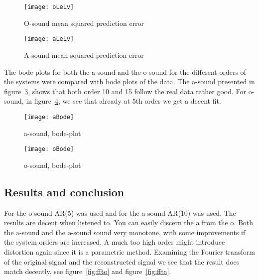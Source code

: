 \documentclass[10pt]{article}
\begin{document}
\begin{figure}[!hp]

    \begin{center}
      \texttt{[image: oLeLv]}
    \caption{O-sound mean squared prediction error \label{fig:oLeLv}}
    \end{center}

\end{figure}

\begin{figure}[!hp]

    \begin{center}
      \texttt{[image: aLeLv]}
    \caption{A-sound mean squared prediction error \label{fig:aLeLv}}
    \end{center}

\end{figure}

The bode plots for both the a-sound and the o-sound for the different orders of
the systems were compared with bode plots of the data. The a-sound presented in
figure~\ref{fig:aBode}, shows that both order 10 and 15 follow the real data
rather good. For o-sound, in figure~\ref{fig:oBode}, we see that already at
5th order we get a decent fit.


\begin{figure}[!hp]

    \begin{center}
      \texttt{[image: aBode]}
    \caption{a-sound, bode-plot \label{fig:aBode}}
    \end{center}

\end{figure}

\begin{figure}[!hp]

    \begin{center}
      \texttt{[image: oBode]}
    \caption{o-sound, bode-plot \label{fig:oBode}}
    \end{center}
\end{figure}

\subsection{Results and conclusion}
For the o-sound AR(5) was used and for the a-sound AR(10) was used.
The results are decent when listened to. You can easily discern the a from the o.
Both the a-sound and the o-sound sound very monotone, with some improvements if
the system orders are increased.
A much too high order might introduce distortion again since it is a parametric method.
Examining the Fourier transform of the original signal and the reconstructed
signal we see that the result does match decently, see figure~\ref{fig:ffto} and
figure~\ref{fig:ffta}.
\end{document}
